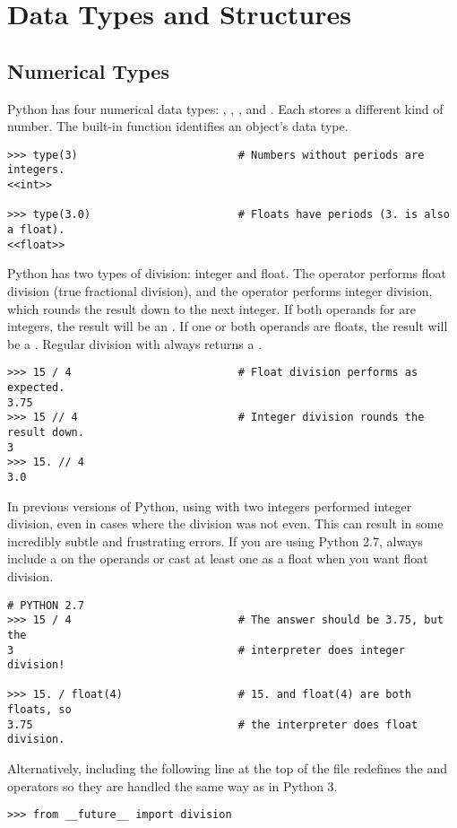 \section*{Data Types and Structures} %

\subsection*{Numerical Types} %

Python has four numerical data types: , ,
, and .
Each stores a different kind of number.
The built-in function  identifies an object's data type.

\begin{lstlisting}
>>> type(3)                         # Numbers without periods are integers.
<<int>>

>>> type(3.0)                       # Floats have periods (3. is also a float).
<<float>>
\end{lstlisting}

Python has two types of division: integer and float.
The \li{/} operator performs float division (true fractional division), and the \li{//} operator performs integer division, which rounds the result down to the next integer.
If both operands for \li{//} are integers, the result will be an .
If one or both operands are floats, the result will be a .
Regular division with \li{/} always returns a .

\begin{lstlisting}
>>> 15 / 4                          # Float division performs as expected.
3.75
>>> 15 // 4                         # Integer division rounds the result down.
3
>>> 15. // 4
3.0
\end{lstlisting}

\begin{warn} %
In previous versions of Python, using \li{/} with two integers performed integer division, even in cases where the division was not even.
This can result in some incredibly subtle and frustrating errors.
If you are using Python 2.7, always include a  on the operands or cast at least one as a float when you want float division.
\begin{lstlisting}
# PYTHON 2.7
>>> 15 / 4                          # The answer should be 3.75, but the
3                                   # interpreter does integer division!

>>> 15. / float(4)                  # 15. and float(4) are both floats, so
3.75                                # the interpreter does float division.
\end{lstlisting}
Alternatively, including the following line at the top of the file redefines the \li{/} and \li{//} operators so they are handled the same way as in Python 3.
\begin{lstlisting}
>>> from __future__ import division
\end{lstlisting}
\end{warn}

